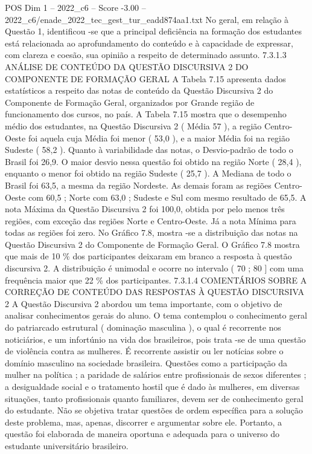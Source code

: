 \begin{textsample}{POS Dim 1 – 2022\_c6 – Score -3.00 – 2022\_c6/enade\_2022\_tec\_gest\_tur\_eadd874aa1.txt}
No geral, em relação à Questão 1, identificou -se que a principal deficiência na formação dos estudantes está relacionada ao aprofundamento do conteúdo e à capacidade de expressar, com clareza e coesão, sua opinião a respeito de determinado assunto. 7.3.1.3 ANÁLISE DE CONTEÚDO DA QUESTÃO DISCURSIVA 2 DO COMPONENTE DE FORMAÇÃO GERAL A Tabela 7.15 apresenta dados estatísticos a respeito das notas de conteúdo da Questão Discursiva 2 do Componente de Formação Geral, organizados por Grande região de funcionamento dos cursos, no país.
A Tabela 7.15 mostra que o desempenho médio dos estudantes, na Questão Discursiva 2 ( Média 57 ), a região Centro-Oeste foi aquela cuja Média foi menor ( 53,0 ), e a maior Média foi na região Sudeste ( 58,2 ).
Quanto à variabilidade das notas, o Desvio-padrão de todo o Brasil foi 26,9.
O maior desvio nessa questão foi obtido na região Norte ( 28,4 ), enquanto o menor foi obtido na região Sudeste ( 25,7 ).
A Mediana de todo o Brasil foi 63,5, a mesma da região Nordeste.
As demais foram as regiões Centro-Oeste com 60,5 ; Norte com 63,0 ; Sudeste e Sul com mesmo resultado de 65,5.
A nota Máxima da Questão Discursiva 2 foi 100,0, obtida por pelo menos três regiões, com exceção das regiões Norte e Centro-Oeste.
Já a nota Mínima para todas as regiões foi zero.
No Gráfico 7.8, mostra -se a distribuição das notas na Questão Discursiva 2 do Componente de Formação Geral.
O Gráfico 7.8 mostra que mais de 10 \% dos participantes deixaram em branco a resposta à questão discursiva 2.
A distribuição é unimodal e ocorre no intervalo ( 70 ; 80 ] com uma frequência maior que 22 \% dos participantes. 7.3.1.4 COMENTÁRIOS SOBRE A CORREÇÃO DE CONTEÚDO DAS RESPOSTAS À QUESTÃO DISCURSIVA 2 A Questão Discursiva 2 abordou um tema importante, com o objetivo de analisar conhecimentos gerais do aluno.
O tema contemplou o conhecimento geral do patriarcado estrutural ( dominação masculina ), o qual é recorrente nos noticiários, e um infortúnio na vida dos brasileiros, pois trata -se de uma questão de violência contra as mulheres.
É recorrente assistir ou ler notícias sobre o domínio masculino na sociedade brasileira.
Questões como a participação da mulher na política ; a paridade de salários entre profissionais de sexos diferentes ; a desigualdade social e o tratamento hostil que é dado às mulheres, em diversas situações, tanto profissionais quanto familiares, devem ser de conhecimento geral do estudante.
Não se objetiva tratar questões de ordem específica para a solução deste problema, mas, apenas, discorrer e argumentar sobre ele.
Portanto, a questão foi elaborada de maneira oportuna e adequada para o universo do estudante universitário brasileiro.

\end{textsample}

